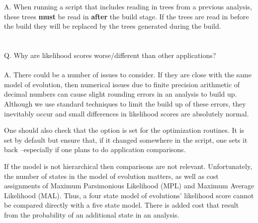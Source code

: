 A. When running a script that includes reading in trees from a previous analysis, these trees {\bf must} be read 
in {\bf after} the build stage.  If the trees are read in before the build they will be replaced by the trees 
generated during the build.\\
\\
\\
Q. Why are likelihood scores worse/different than other applications?\\
\\
A. There could be a number of issues to consider. If they are close with the same model of
evolution, then numerical issues due to finite precision arithmetic of decimal numbers can cause
slight rounding errors in an analysis to build up. Although we use standard techniques to limit the
build up of these errors, they inevitably occur and small differences in likelihood scores are
absolutely normal.

One should also check that the  option is set for the optimization routines.
It is set by default but ensure that, if it changed somewhere in the script, one sets it back
--especially if one plans to do application comparisons.

If the model is not hierarchical then comparisons are not relevant. Unfortunately, the number of
states in the model of evolution matters, as well as cost assignments of Maximum Parsimonious
Likelihood (MPL) and Maximum Average Likelihood (MAL). Thus, a four state model of evolutions'
likelihood score cannot be compared directly with a five state model. There is added cost that
result from the probability of an additional state in an analysis. 
\\
\\

